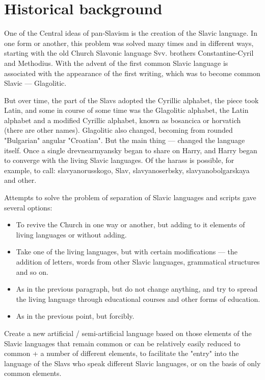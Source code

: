 \section{Historical background}

One of the Central ideas of pan-Slavism is the creation of the Slavic language. In one form or another, this problem was solved many times and in different ways, starting with the old Church Slavonic language Svv. brothers Constantine-Cyril and Methodius. With the advent of the first common Slavic language is associated with the appearance of the first writing, which was to become common Slavic — Glagolitic.

But over time, the part of the Slavs adopted the Cyrillic alphabet, the piece took Latin, and some in course of some time was the Glagolitic alphabet, the Latin alphabet and a modified Cyrillic alphabet, known as bosancica or horvatich (there are other names). Glagolitic also changed, becoming from rounded "Bulgarian" angular "Croatian". But the main thing — changed the language itself. Once a single drevnearmyansky began to share on Harry, and Harry began to converge with the living Slavic languages. Of the harass is possible, for example, to call: slavyanorusskogo, Slav, slavyanoserbsky, slavyanobolgarskaya and other.

Attempts to solve the problem of separation of Slavic languages and scripts gave several options:

\begin{itemize}
	\item To revive the Church in one way or another, but adding to it elements of living languages or without adding.
	\item Take one of the living languages, but with certain modifications — the addition of letters, words from other Slavic languages, grammatical structures and so on.
	\item As in the previous paragraph, but do not change anything, and try to spread the living language through educational courses and other forms of education.
	\item As in the previous point, but forcibly.
\end{itemize}

Create a new artificial / semi-artificial language based on those elements of the Slavic languages that remain common or can be relatively easily reduced to common + a number of different elements, to facilitate the "entry" into the language of the Slavs who speak different Slavic languages, or on the basis of only common elements.

